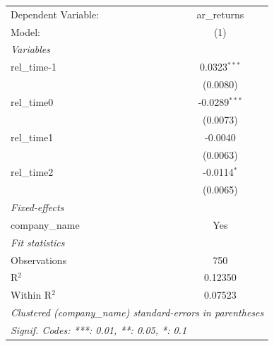 
\begingroup
\centering
\begin{tabular}{lc}
   \tabularnewline \midrule \midrule
   Dependent Variable: & ar\_returns\\   
   Model:              & (1)\\  
   \midrule
   \emph{Variables}\\
   rel\_time-1         & 0.0323$^{***}$\\   
                       & (0.0080)\\   
   rel\_time0          & -0.0289$^{***}$\\   
                       & (0.0073)\\   
   rel\_time1          & -0.0040\\   
                       & (0.0063)\\   
   rel\_time2          & -0.0114$^{*}$\\   
                       & (0.0065)\\   
   \midrule
   \emph{Fixed-effects}\\
   company\_name       & Yes\\  
   \midrule
   \emph{Fit statistics}\\
   Observations        & 750\\  
   R$^2$               & 0.12350\\  
   Within R$^2$        & 0.07523\\  
   \midrule \midrule
   \multicolumn{2}{l}{\emph{Clustered (company\_name) standard-errors in parentheses}}\\
   \multicolumn{2}{l}{\emph{Signif. Codes: ***: 0.01, **: 0.05, *: 0.1}}\\
\end{tabular}
\par\endgroup


